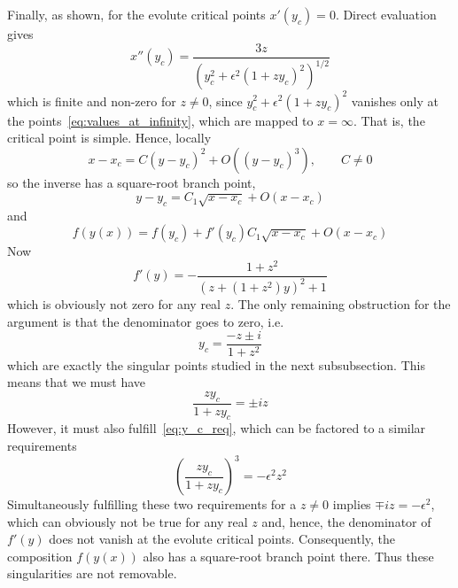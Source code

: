 \documentclass[a4paper]{amsart}
\begin{document}
Finally, as shown, for the evolute critical points $x'(y_c)=0$. Direct evaluation gives
\begin{equation*}
x''(y_c)=
\frac{3z}
{\left(y_c^2+\epsilon^2(1+zy_c)^2\right)^{1/2}}
\end{equation*}
which is finite and non-zero for $z\neq0$, since $y_c^2+\epsilon^2(1+zy_c)^2$ vanishes only at the points~\eqref{eq:values_at_infinity}, which are mapped to $x=\infty$. That is, the critical point is simple. Hence, locally
\begin{equation*}
x-x_c = C(y-y_c)^2+O((y-y_c)^3), \qquad C\neq0
\end{equation*}
so the inverse has a square-root branch point,
\begin{equation*}
y-y_c = C_1\sqrt{x-x_c}+O(x-x_c)
\end{equation*}
and
\begin{equation}\label{eq:roc_structure}
f(y(x))
=
f(y_c)+f'(y_c)C_1\sqrt{x-x_c}+O(x-x_c)
\end{equation}
Now
\begin{equation*}
f'(y)=
-\frac{1+z^2}
{\left(z+(1+z^2)y\right)^2+1}
\end{equation*}
which is obviously not zero for any real $z$. The only remaining obstruction for the argument is that the denominator goes to zero, i.e.
\begin{equation*}
y_c=\frac{-z\pm i}{1+z^2}
\end{equation*}
which are exactly the singular points studied in the next subsubsection. This means that we must have
\begin{equation*}
\frac{zy_c}{1+zy_c}=\pm iz
\end{equation*}
However, it must also fulfill~\eqref{eq:y_c_req}, which can be factored to a similar requirements
\begin{equation*}
\left(\frac{zy_c}{1+zy_c}\right)^3
=
-\epsilon^2 z^2
\end{equation*}
Simultaneously fulfilling these two requirements for a $z\neq0$ implies $\mp iz=-\epsilon^2$, which can obviously not be true  for any real $z$ and, hence, the denominator of $f'(y)$ does not vanish at the evolute critical points. Consequently, the composition $f(y(x))$ also has a square-root branch point there. Thus these singularities are not removable.
\end{document}
